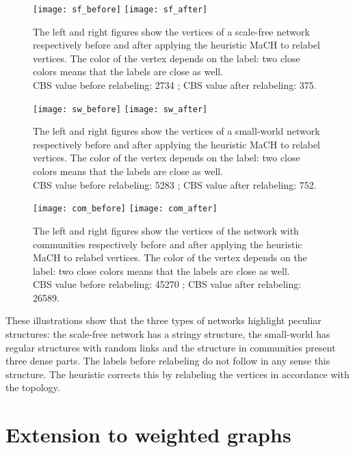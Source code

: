 \documentclass{scrartcl}
\theoremstyle{plain}
\newcommand{\algo}{MaCH}
\newcommand{\cbs}{CBS}
\begin{document}
\begin{figure}[htp]
	\centering
 
	\texttt{[image: sf\_before]} \hspace{1cm}
	\texttt{[image: sf\_after]}

	\caption{\label{fig:sf}The left and right figures show the vertices of a 
scale-free network respectively before and after applying the heuristic \algo{} 
to relabel vertices. The color of the vertex depends on the label: two close 
colors means that the labels are close as well.\\ \cbs{} value before 
relabeling: 2734 ; \cbs{} value after relabeling: 375.}
\end{figure}

\begin{figure}[htp]
	\centering
	\texttt{[image: sw\_before]} \hspace{1cm}
	\texttt{[image: sw\_after]}

	\caption{\label{fig:sw}The left and right figures show the vertices of a 
small-world network respectively before and after applying the heuristic \algo{} 
to relabel vertices. The color of the vertex depends on the label: two close 
colors means that the labels are close as well.\\ \cbs{} value before 
relabeling: 5283 ; \cbs{} value after relabeling: 752.}
\end{figure}


\begin{figure}[htp]
	\centering
	\texttt{[image: com\_before]} \hspace{1cm}
	\texttt{[image: com\_after]}
	
	\caption{\label{fig:com}The left and right figures show the vertices of the 
network with communities respectively before and after applying the heuristic 
\algo{} to relabel vertices. The color of the vertex depends on the label: two 
close colors means that the labels are close as well. \\ \cbs{} value before 
relabeling: 45270 ; \cbs{} value after relabeling: 26589.}
\end{figure}

These illustrations show that the three types of networks highlight peculiar 
structures: the scale-free network has a stringy structure, the small-world has 
regular structures with random links and the structure in communities present 
three dense parts. The labels before relabeling do not follow in any sense this 
structure. The heuristic corrects this by relabeling the vertices in accordance 
with the topology. 
\makeatletter{}\section{Extension to weighted graphs}
\label{sec:extension}
\end{document}
